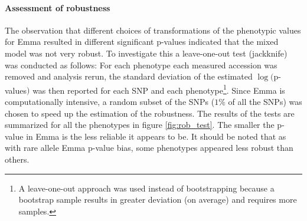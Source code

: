 \documentclass[10pt]{article}
\begin{document}





\paragraph*{Assessment of robustness}
The observation that different choices of transformations of the phenotypic values for Emma resulted in different significant p-values indicated that the mixed model was not very robust.  To investigate this a leave-one-out test (jackknife) was conducted as follows: For each phenotype each measured accession was removed and analysis rerun, the standard deviation of the estimated $\log($p-values$)$ was then reported for each SNP and each phenotype\footnote{A leave-one-out approach was used instead of  bootstrapping because a bootstrap sample results in greater deviation (on average) and requires more samples.}.  Since Emma is computationally intensive, a random subset of the SNPs ($1\%$ of all the SNPs) was chosen to speed up the estimation of the robustness. The results of the tests are summarized for all the phenotypes in figure \ref{fig:rob_test}.  The smaller the p-value in Emma is the less reliable it appears to be.  It should be noted that as with rare allele Emma p-value bias, some phenotypes appeared less robust than others.
\end{document}
